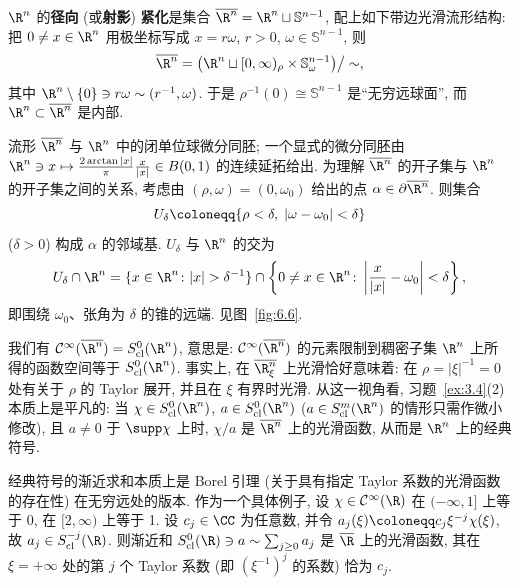 \begin{definition}[径向紧化]\label{def:6.48}
$\R^n$ 的\textbf{径向} (或\textbf{射影}) \textbf{紧化}是集合 $\overline{\R^n} = \R^n \sqcup \mathbb{S}^{n-1}$, 配上如下带边光滑流形结构: 把 $0 \neq x \in \R^n$ 用极坐标写成 $x = r\omega$, $r > 0$, $\omega \in \mathbb{S}^{n-1}$, 则
\begin{equation}\label{eq:6.89}
    \overline{\R^n} = \big( \R^n \sqcup [0, \infty)_\rho \times \mathbb{S}^{n-1}_\omega \big) \big/ \sim,
\end{equation}
其中 $\R^n \setminus \{0\} \ni r\omega \sim (r^{-1}, \omega)$. 于是 $\rho^{-1}(0) \cong \mathbb{S}^{n-1}$ 是``无穷远球面'', 而 $\R^n \subset \overline{\R^n}$ 是内部.
\end{definition}

流形 $\overline{\R^n}$ 与 $\R^n$ 中的闭单位球微分同胚; 一个显式的微分同胚由
$\R^n \ni x \mapsto \frac{2\arctan|x|}{\pi}\frac{x}{|x|} \in B(0, 1)$ 的连续延拓给出. 为理解 $\overline{\R^n}$ 的开子集与 $\R^n$ 的开子集之间的关系, 考虑由 $(\rho, \omega) = (0, \omega_0)$ 给出的点 $\alpha \in \partial\overline{\R^n}$. 则集合
\begin{equation}\label{eq:6.90}
    U_\delta \defeq \{\rho < \delta, \; |\omega - \omega_0| < \delta\}
\end{equation}
($\delta > 0$) 构成 $\alpha$ 的邻域基. $U_\delta$ 与 $\R^n$ 的交为
\begin{equation}\label{eq:6.91}
    U_\delta \cap \R^n = \{x \in \R^n \colon |x| > \delta^{-1}\} \cap \left\{0 \neq x \in \R^n \colon \left| \frac{x}{|x|} - \omega_0 \right| < \delta\right\},
\end{equation}
即围绕 $\omega_0$、张角为 $\delta$ 的锥的远端. 见图~\ref{fig:6.6}.

我们有 $\Smooth(\overline{\R^n}) = S^0_{\mathrm{cl}}(\R^n)$, 意思是: $\Smooth(\overline{\R^n})$ 的元素限制到稠密子集 $\R^n$ 上所得的函数空间等于 $S^0_{\mathrm{cl}}(\R^n)$. 事实上, 在 $\overline{\R^n_\xi}$ 上光滑恰好意味着: 在 $\rho = |\xi|^{-1} = 0$ 处有关于 $\rho$ 的 Taylor 展开, 并且在 $\xi$ 有界时光滑. 从这一视角看, 习题~\ref{ex:3.4}(2) 本质上是平凡的: 当 $\chi \in S^0_{\mathrm{cl}}(\R^n)$, $a \in S^0_{\mathrm{cl}}(\R^n)$ ($a \in S^m_{\mathrm{cl}}(\R^n)$ 的情形只需作微小修改), 且 $a \neq 0$ 于 $\supp \chi$ 上时, $\chi/a$ 是 $\overline{\R^n}$ 上的光滑函数, 从而是 $\R^n$ 上的经典符号.

\begin{remark}\label{rem:6.49}
经典符号的渐近求和本质上是 Borel 引理 (关于具有指定 Taylor 系数的光滑函数的存在性) 在无穷远处的版本. 作为一个具体例子, 设 $\chi \in \Smooth(\R)$ 在 $(-\infty, 1]$ 上等于 0, 在 $[2, \infty)$ 上等于 1. 设 $c_j \in \CC$ 为任意数, 并令 $a_j(\xi) \defeq c_j \xi^{-j}\chi(\xi)$, 故 $a_j \in S^{-j}_{\mathrm{cl}}(\R)$. 则渐近和 $S^0_{\mathrm{cl}}(\R) \ni a \sim \sum_{j \ge 0} a_j$ 是 $\overline{\R}$ 上的光滑函数, 其在 $\xi = +\infty$ 处的第 $j$ 个 Taylor 系数 (即 $(\xi^{-1})^j$ 的系数) 恰为 $c_j$.
\end{remark}

